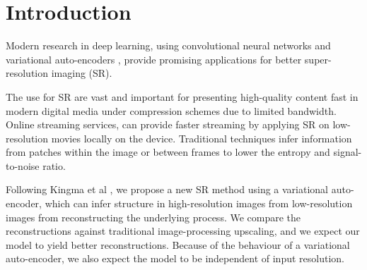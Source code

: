 \section{Introduction}
\label{sec:introduction}

Modern research in deep learning, using convolutional neural networks \cite{Dong15} and variational auto-encoders \cite{Kingma2013, Johnson16}, provide promising applications for better super-resolution imaging (SR).

The use for SR are vast and important for presenting high-quality content fast in modern digital media under compression schemes due to limited bandwidth.
Online streaming services, can provide faster streaming by applying SR on low-resolution movies locally on the device.
Traditional techniques infer information from patches within the image or between frames to lower the entropy and signal-to-noise ratio. 


Following Kingma et al \cite{Kingma2013}, we propose a new SR method using a variational auto-encoder, which can infer structure in high-resolution images from low-resolution images from reconstructing the underlying process. We compare the reconstructions against traditional image-processing upscaling, and we expect our model to yield better reconstructions. Because of the behaviour of a variational auto-encoder, we also expect the model to be independent of input resolution.

